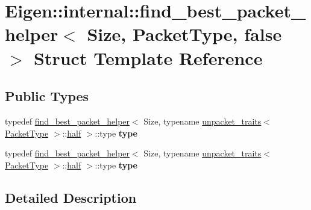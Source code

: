 \hypertarget{struct_eigen_1_1internal_1_1find__best__packet__helper_3_01_size_00_01_packet_type_00_01false_01_4}{}\section{Eigen\+:\+:internal\+:\+:find\+\_\+best\+\_\+packet\+\_\+helper$<$ Size, Packet\+Type, false $>$ Struct Template Reference}
\label{struct_eigen_1_1internal_1_1find__best__packet__helper_3_01_size_00_01_packet_type_00_01false_01_4}
\subsection*{Public Types}
\begin{DoxyCompactItemize}
\item 
\mbox{\label{struct_eigen_1_1internal_1_1find__best__packet__helper_3_01_size_00_01_packet_type_00_01false_01_4_a60cab6855e901dac36aef09163bb8739}} 
typedef \hyperlink{struct_eigen_1_1internal_1_1find__best__packet__helper}{find\+\_\+best\+\_\+packet\+\_\+helper}$<$ Size, typename \hyperlink{struct_eigen_1_1internal_1_1unpacket__traits}{unpacket\+\_\+traits}$<$ \hyperlink{struct_eigen_1_1_packet_type}{Packet\+Type} $>$\+::\hyperlink{struct_eigen_1_1half}{half} $>$\+::type {\bfseries type}
\item 
\mbox{\label{struct_eigen_1_1internal_1_1find__best__packet__helper_3_01_size_00_01_packet_type_00_01false_01_4_a60cab6855e901dac36aef09163bb8739}} 
typedef \hyperlink{struct_eigen_1_1internal_1_1find__best__packet__helper}{find\+\_\+best\+\_\+packet\+\_\+helper}$<$ Size, typename \hyperlink{struct_eigen_1_1internal_1_1unpacket__traits}{unpacket\+\_\+traits}$<$ \hyperlink{struct_eigen_1_1_packet_type}{Packet\+Type} $>$\+::\hyperlink{struct_eigen_1_1half}{half} $>$\+::type {\bfseries type}
\end{DoxyCompactItemize}


\subsection{Detailed Description}
